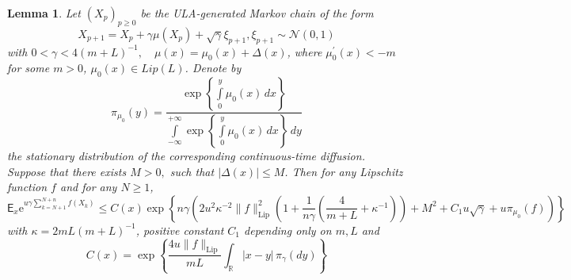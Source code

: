 \documentclass[bj]{imsart}
\def\PE{\mathsf{E}}
\def\rset{\mathbb{R}}
\def\rme{\mathrm{e}}
\def\rset{\mathbb{R}}
\newtheorem{lem}[thm]{Lemma}
\begin{document}
\begin{lem} 
\label{lem:exp_bound}
Let $(X_p)_{p \geq 0}$ be the ULA-generated Markov chain of the form
\[
X_{p+1} = X_p + \gamma \mu(X_p) + \sqrt{\gamma}\xi_{p+1}, \xi_{p+1} \sim \mathcal{N}(0,1)
\]
 with $0 < \gamma < 4(m+L)^{-1}, \quad \mu(x) = \mu_{0}(x) + \Delta(x)$, where $\mu_0^{\prime}(x) <-m$ for some $m > 0$, $\mu_0(x) \in Lip(L)$. Denote by 
 \[
 \pi_{\mu_0}(y) = \frac{\exp\left\{\int\limits_{0}^{y}\mu_{0}(x)\,dx\right\}}{\int\limits_{-\infty}^{+\infty}\exp\left\{\int\limits_{0}^{y}\mu_{0}(x)\,dx\right\}\,dy}
 \]
 the stationary distribution of the corresponding continuous-time diffusion.
 Suppose that there exists $M > 0,$ such that $\left|\Delta(x)\right| \leq M$.
 Then for any Lipschitz function $f$ and for any $ N \geq 1$,
\begin{equation}
\label{eq:exp_bound}
\PE_x \rme^{u\gamma\sum\limits_{k=N+1}^{N+n}f(X_k)} \leq C(x)\exp\left\{n\gamma\left(2u^2\kappa^{-2} \|f\|^2_{\text{Lip}}\left(1+\frac{1}{n\gamma}\left(\frac{4}{m+L} + \kappa^{-1}\right)\right) + M^2 + C_1u\sqrt{\gamma} +  u\pi_{\mu_0}(f)\right)\right\}
\end{equation}
with $\kappa = 2mL(m+L)^{-1}$, positive constant $C_1$ depending only on $m,L$ and 
\[
C(x) = \exp\left\{\frac{4u\|f\|_{\text{Lip}}}{mL}\int_{\rset}|x-y|\,\pi_{\gamma}(dy)\right\}
\]
\end{lem}
\end{document}
